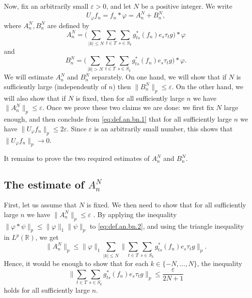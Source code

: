 \documentclass[reqno,a4paper,12pt]{amsart}
\numberwithin{equation}{section}
\numberwithin{figure}{section}
\newcommand\R{\mathbb{R}}
\newcommand\1{\mathds{1}}
\newcommand\eps{\varepsilon}
\newcommand{\pphi}{\varphi}
\newcommand{\TTT}{T}
\newcommand{\SSS}{S}
\newcommand{\ts}{\tau}
\renewcommand\le{\leqslant}
\theoremstyle{plain}
\theoremstyle{definition}
\begin{document}
Now, fix an arbitrarily small  $\eps > 0$, and
let $N$ be a positive integer. We write
\begin{equation}
\label{eq:def.an.bn.1} 
U_\pphi f_n  = f_n\ast\pphi   = A^N_n + B^N_n,
\end{equation}
where $A^N_n, B^N_n$ are defined by
\begin{equation}
 \label{eq:def.an.bn.2}
A^N_n = \Big(  \sum_{|k| \le N} \sum_{t\in \TTT}  \sum_{s\in \SSS_k}
 g_{ts}^*(f_n)  e_s \ts_t g \Big) \ast \pphi  
\end{equation}
and
\begin{equation}
 \label{eq:def.an.bn.3}
B^N_n =   \Big(  \sum_{|k| > N} \sum_{t\in \TTT}  \sum_{s\in \SSS_k}
 g_{ts}^*(f_n)  e_s \ts_t g \Big) \ast \pphi.
\end{equation}
We will estimate $A^N_n$ and $B^N_n$ separately. On one hand, we will 
show that if $N$ is sufficiently large (independently of $n$)
then  $ \|B^N_n\|_p \le \eps$.
 On the other hand, we will also show that if $N$ is fixed, then
for all sufficiently large $n$ we have $\|A^N_n\|_p \le\eps$.
Once we prove these two claims we are 
done: we first fix $N$ large enough, and then conclude 
from \eqref{eq:def.an.bn.1}  that 
for all sufficiently large $n$ we have $\|U_\pphi f_n\|_p \le 2\eps$.
Since $\eps $ is an arbitrarily small number,
 this shows that $\|U_\pphi f_n\|_p \to 0$.

It remains to prove the two required estimates of $A^N_n$ and $B^N_n$.

\subsection{The estimate of $A^N_n$}
First, let us assume that $N$ is fixed. We then need to 
show that for all sufficiently large $n$ we have
$\|A^N_n\|_p \le\eps$ . 
 By applying the inequality 
$\|\pphi \ast \psi \|_p \le \|\pphi\|_1 \|\psi\|_p$
to \eqref{eq:def.an.bn.2}, and using
 the triangle inequality  in  $L^p(\R)$, we get
\begin{equation}
\label{eq:an.c.1}
\|A^N_n \|_p \le  \|\pphi\|_1 \sum_{|k| \le N} \Big\|  \sum_{t\in\TTT} \sum_{s\in \SSS_k}
 g_{ts}^*(f_n) e_s \ts_t g \Big\|_p.
\end{equation}
Hence, it would be enough to show that for each $k \in \{-N, \dots, N\}$, the inequality
\begin{equation}
\label{eq:6.78.1}
\Big\|  \sum_{t\in\TTT} \sum_{s\in \SSS_k}  
g_{ts}^*(f_n) e_s \ts_t g \Big\|_p \le\frac{\eps}{2N+1}
\end{equation}
holds for all sufficiently large $n$.
\end{document}
